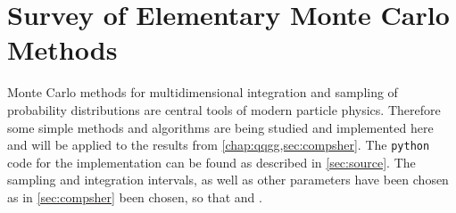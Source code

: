 
\chapter{Survey of Elementary Monte Carlo Methods}%
\label{chap:mc}

Monte Carlo methods for multidimensional integration and sampling of
probability distributions are central tools of modern particle
physics. Therefore some simple methods and algorithms are being
studied and implemented here and will be applied to the results from
\cref{chap:qqgg,sec:compsher}. The \verb|python| code for the
implementation can be found as described in \cref{sec:source}. The
sampling and integration intervals, as well as other parameters have
been chosen as in \cref{sec:compsher} been chosen, so that
 and \!.
